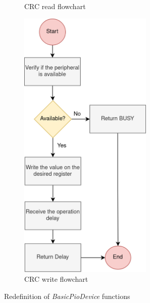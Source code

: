 \begin{figure}[t!]
\begin{subfigure}{0.4\textwidth}
 		\caption[1\textwidth]{CRC read flowchart} 
	 	\label{fig_CrcReadFunction}
	\end{subfigure}
	\hspace{1cm}
	\begin{subfigure}{0.4\textwidth}
		\centering
		\includegraphics[width=0.7\textwidth]{Images/CrcWriteFunction.png}
		\caption[1\textwidth]{CRC write flowchart}
		\label{fig_CrcWriteFunction}
	\end{subfigure}
		
	\caption{Redefinition of \textit{BasicPioDevice} functions}
	\label{fig_Gem5ReadWrite}
\end{figure}
 
